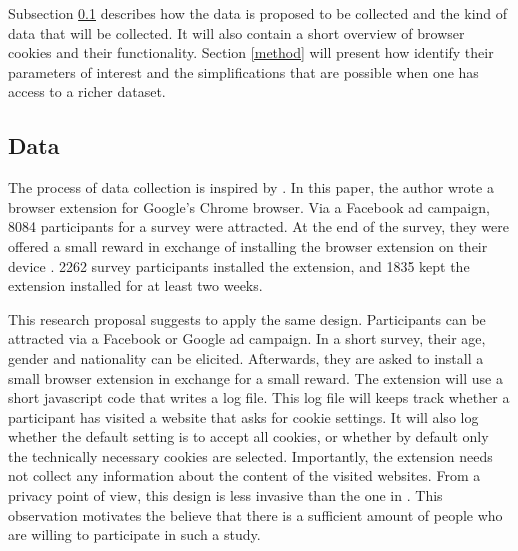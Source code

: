 Subsection \ref{data coll} describes how the data is proposed to be collected and the kind of data that will be collected.
It will also contain a short overview of
browser cookies and their functionality. Section \ref{method} will present how
\textcite{goldin2020} identify their parameters of interest and the simplifications
that are possible when one has access to a richer dataset.

\subsection{Data} \label{data coll}
The process of data collection is inspired by \textcite{levy2020}. In this paper, the
author wrote a browser extension for Google's Chrome browser. Via a Facebook ad campaign,
8084 participants for a survey were attracted. At the end of the survey, they were offered a
small reward in exchange of installing the browser extension on their device \parencite[p. 9]{levy2020}.
2262 survey participants installed the extension, and 1835 kept the extension installed for at least two weeks.

This research proposal suggests to apply the same design. Participants can be attracted
via a Facebook or Google ad campaign. In a short survey, their age, gender and nationality can
be elicited. Afterwards, they are asked to install a small browser extension in exchange for
a small reward. The extension will use a short javascript code that writes a log file. This log file will keeps track whether a participant has 
visited a website that asks for cookie settings. It will also log whether
the default setting is to accept all cookies, or whether by default only the technically necessary cookies are selected.
Importantly, the extension needs not collect any information about the content of the visited websites. From a privacy point of view,
this design is less invasive than the one in \textcite{levy2020}. This observation motivates the believe that there is a sufficient amount of people who are willing
to participate in such a study.

